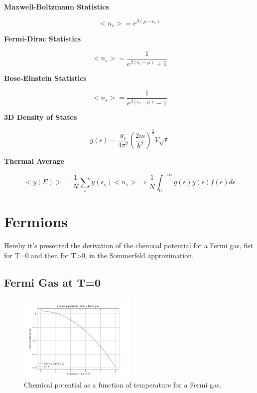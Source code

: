 \documentclass{article}
\begin{document}
\newpage
\begin{tcolorbox}[colframe=gray!90, colback=gray!5, coltitle=white, sharp corners, title=\textbf{Quantum Statistical Mechanics, Summary}, fonttitle=\large\bfseries]
    \textbf{Maxwell-Boltzmann Statistics}

    \begin{equation}
        <n_s>=e^{\beta(\mu-\epsilon_s)}
    \end{equation}

    \textbf{Fermi-Dirac Statistics}

    \begin{equation}
        <n_s>=\frac{1}{e^{\beta(\epsilon_s-\mu)}+1}
    \end{equation}

    \textbf{Bose-Einstein Statistics}

    \begin{equation}
        <n_s>=\frac{1}{e^{\beta(\epsilon_s-\mu)}-1}
    \end{equation}

    \textbf{3D Density of States}

    \begin{equation}
        g(\epsilon)=\frac{g_s}{4\pi^2}\left( \frac{2m}{\hbar^2} \right)^{\frac{3}{2}}V\sqrt{\epsilon}
    \end{equation}

    \textbf{Thermal Average}

    \begin{equation}
        <y(E)>=\frac{1}{N}\sum_{s}y(\epsilon_s)<n_s>\Longrightarrow \frac{1}{N}\int_0^{+\infty}g(\epsilon)y(\epsilon)f(\epsilon)d\epsilon
    \end{equation}
\end{tcolorbox}
\newpage

\section{Fermions}

Hereby it's presented the derivation of the chemical potential for a Fermi gas,
fist for T=0 and then for T>0, in the Sommerfeld approximation.

\subsection{Fermi Gas at T=0}

\begin{figure}[h]
    \centering
    \includegraphics[width=0.5\textwidth]{images/mu-fermions.png}
    \caption{Chemical potential as a function of temperature for a Fermi gas.}
    \label{fig:mu-fermions}
\end{figure}
\end{document}
